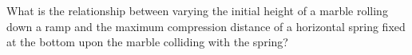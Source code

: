 What is the relationship between varying the initial height of a marble rolling down a ramp and the maximum compression distance of a horizontal spring fixed at the bottom upon the marble colliding with the spring?
